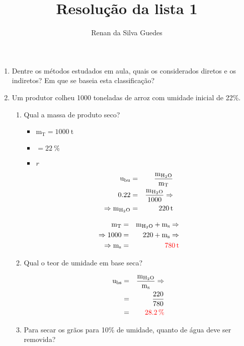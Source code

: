 \documentclass[a4paper, 12pt]{article}
\title{Resolução da lista 1}
\author{Renan da Silva Guedes}
\newcommand{\tmass}{\text{m}_{\text{T}}}
\newcommand{\wmass}{\text{m}_{\ce{H2O}}}
\newcommand{\smass}{\text{m}_{\text{\text{s}}}}
\newcommand{\ubu}{\text{u}_{\text{bu}}}
\newcommand{\ubs}{\text{u}_{\text{bs}}}
\begin{document}
	\maketitle
	
	\begin{enumerate}
		\item Dentre os métodos estudados em aula, quais os considerados diretos e os indiretos? Em que se baseia esta classificação? 
		
		\item Um produtor colheu 1000 toneladas de arroz com umidade inicial de 22\%.
		
		\begin{enumerate}
			\item Qual a massa de produto seco?\\
			
			\begin{itemize}
				\item $\tmass=\SI{1000}{\tonne}$
				\item $=\SI{22}{\percent}$
				\item $r$
			\end{itemize}
		
			\begin{eqnarray}
				\ubu&=&\dfrac{\wmass}{\tmass}\\
				0.22&=&\dfrac{\wmass}{1000}\Rightarrow\\
				\Rightarrow\wmass&=&\SI{220}{\tonne}
			\end{eqnarray}
			
			\begin{eqnarray}
				\tmass&=&\wmass+\smass\Rightarrow\\
				\Rightarrow 1000&=&220+\smass\Rightarrow\\
				\Rightarrow\smass&=&\textcolor{red}{\SI{780}{\tonne}}
			\end{eqnarray}
	
			\item Qual o teor de umidade em base seca?
			
			\begin{eqnarray}
				\ubs&=&\dfrac{\wmass}{\smass}\Rightarrow\\
				&=&\dfrac{220}{780}\\
				&=&\textcolor{red}{\SI{28.2}{\percent}}
			\end{eqnarray}
			
			\item Para secar os grãos para 10\% de umidade, quanto de água deve ser removida?
			

\end{enumerate}
\end{enumerate}
\end{document}

